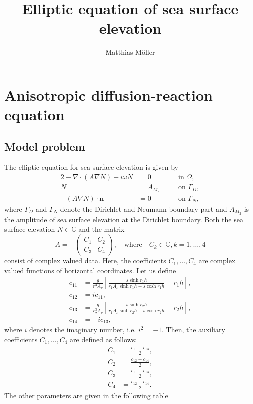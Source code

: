 \documentclass[11pt,a4paper]{article}
\title{Elliptic equation of sea surface elevation}
\author{Matthias M\"oller}
\begin{document}
\maketitle

\section{Anisotropic diffusion-reaction equation}
\subsection{Model problem}
The elliptic equation for sea surface elevation is given by
\begin{alignat}{2}
-\nabla\cdot(A\nabla N)-i\omega N&=0  \quad && \text{in } \Omega,
\label{eq:sse_scalar1}\\
N&=A_{M_2} \quad && \text{on } \Gamma_D,
\label{eq:sse_scalar2}\\
-(A\nabla N)\cdot\mathbf{n}&=0 \quad && \text{on } \Gamma_N,
\label{eq:sse_scatar3}
\end{alignat}
where $\Gamma_D$ and $\Gamma_N$ denote the Dirichlet and Neumann boundary part and $A_{M_2}$ is the amplitude of sea surface elevation at the Dirichlet boundary. Both the sea surface elevation $N\in\mathbb{C}$ and the matrix
$$
A=-
\begin{pmatrix}
C_1 & C_2\\
C_3 & C_4
\end{pmatrix},\quad\text{where}\quad C_k\in\mathbb{C}, k=1,\dots,4
$$
consist of complex valued data. Here, the coefficients $C_1,\dots,C_4$ are complex valued functions of horizontal coordinates. Let us define
\begin{align*}
c_{11}&=\frac{g}{r_1^3A_\nu}\left[\frac{s \sinh r_1 h}{r_1 A_\nu \sinh r_1 h + s \cosh r_1 h}-r_1 h\right],\\
c_{12}&=ic_{11},\\
c_{13}&=\frac{g}{r_2^3A_\nu}\left[\frac{s \sinh r_2 h}{r_1 A_\nu \sinh r_2 h + s \cosh r_2 h}-r_2 h\right],\\
c_{14}&=-ic_{13},
\end{align*}
where $i$ denotes the imaginary number, i.e. $i^2=-1$. Then, the auxiliary coefficients $C_1,\dots,C_4$ are defined as follows:
\begin{align}
C_1&=\frac{c_{11}+c_{13}}{2},\\
C_2&=\frac{c_{12}+c_{14}}{2},\\
C_3&=\frac{c_{11}-c_{13}}{2},\\
C_4&=\frac{c_{12}-c_{14}}{2}.
\end{align}
The other parameters are given in the following table
\end{document}
